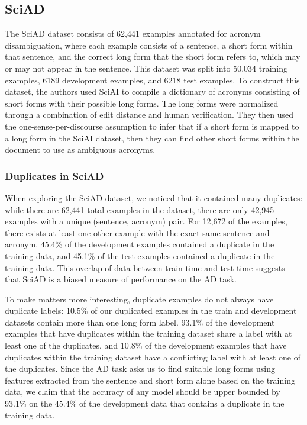 \documentclass[letterpaper]{article} %
\begin{document}
\subsection{SciAD}
The SciAD dataset \cite{veyseh-et-al-2020-what} consists of 62,441 examples annotated for acronym disambiguation, where each example consists of a sentence, a short form within that sentence, and the correct long form that the short form refers to, which may or may not appear in the sentence. This dataset was split into 50,034 training examples, 6189 development examples, and 6218 test examples. To construct this dataset, the authors used SciAI to compile a dictionary of acronyms consisting of short forms with their possible long forms. The long forms were normalized through a combination of edit distance and human verification. They then used the one-sense-per-discourse assumption to infer that if a short form is mapped to a long form in the SciAI dataset, then they can find other short forms within the document to use as ambiguous acronyms.

\subsubsection{Duplicates in SciAD}
When exploring the SciAD dataset, we noticed that it contained many duplicates: while there are 62,441 total examples in the dataset, there are only 42,945 examples with a unique (sentence, acronym) pair. For 12,672 of the examples, there exists at least one other example with the exact same sentence and acronym. 45.4\% of the development examples contained a duplicate in the training data, and 45.1\% of the test examples contained a duplicate in the training data. This overlap of data between train time and test time suggests that SciAD is a biased measure of performance on the AD task.

To make matters more interesting, duplicate examples do not always have duplicate labels: 10.5\% of our duplicated examples in the train and development datasets contain more than one long form label. 93.1\% of the development examples that have duplicates within the training dataset share a label with at least one of the duplicates, and 10.8\% of the development examples that have duplicates within the training dataset have a conflicting label with at least one of the duplicates. Since the AD task asks us to find suitable long forms using features extracted from the sentence and short form alone based on the training data, we claim that the accuracy of any model should be upper bounded by 93.1\% on the 45.4\% of the development data that contains a duplicate in the training data.
\end{document}
